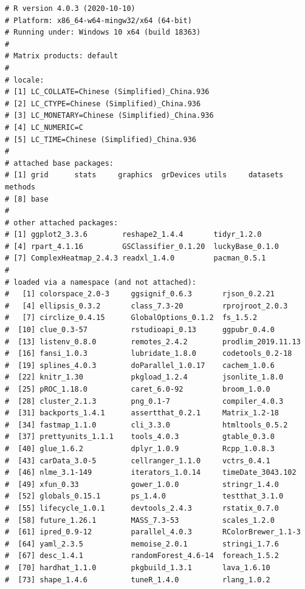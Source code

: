 \documentclass[
  12pt,
]{book}
\begin{document}
\begin{verbatim}
# R version 4.0.3 (2020-10-10)
# Platform: x86_64-w64-mingw32/x64 (64-bit)
# Running under: Windows 10 x64 (build 18363)
# 
# Matrix products: default
# 
# locale:
# [1] LC_COLLATE=Chinese (Simplified)_China.936 
# [2] LC_CTYPE=Chinese (Simplified)_China.936   
# [3] LC_MONETARY=Chinese (Simplified)_China.936
# [4] LC_NUMERIC=C                              
# [5] LC_TIME=Chinese (Simplified)_China.936    
# 
# attached base packages:
# [1] grid      stats     graphics  grDevices utils     datasets  methods  
# [8] base     
# 
# other attached packages:
# [1] ggplot2_3.3.6        reshape2_1.4.4       tidyr_1.2.0         
# [4] rpart_4.1.16         GSClassifier_0.1.20  luckyBase_0.1.0     
# [7] ComplexHeatmap_2.4.3 readxl_1.4.0         pacman_0.5.1        
# 
# loaded via a namespace (and not attached):
#   [1] colorspace_2.0-3     ggsignif_0.6.3       rjson_0.2.21        
#   [4] ellipsis_0.3.2       class_7.3-20         rprojroot_2.0.3     
#   [7] circlize_0.4.15      GlobalOptions_0.1.2  fs_1.5.2            
#  [10] clue_0.3-57          rstudioapi_0.13      ggpubr_0.4.0        
#  [13] listenv_0.8.0        remotes_2.4.2        prodlim_2019.11.13  
#  [16] fansi_1.0.3          lubridate_1.8.0      codetools_0.2-18    
#  [19] splines_4.0.3        doParallel_1.0.17    cachem_1.0.6        
#  [22] knitr_1.30           pkgload_1.2.4        jsonlite_1.8.0      
#  [25] pROC_1.18.0          caret_6.0-92         broom_1.0.0         
#  [28] cluster_2.1.3        png_0.1-7            compiler_4.0.3      
#  [31] backports_1.4.1      assertthat_0.2.1     Matrix_1.2-18       
#  [34] fastmap_1.1.0        cli_3.3.0            htmltools_0.5.2     
#  [37] prettyunits_1.1.1    tools_4.0.3          gtable_0.3.0        
#  [40] glue_1.6.2           dplyr_1.0.9          Rcpp_1.0.8.3        
#  [43] carData_3.0-5        cellranger_1.1.0     vctrs_0.4.1         
#  [46] nlme_3.1-149         iterators_1.0.14     timeDate_3043.102   
#  [49] xfun_0.33            gower_1.0.0          stringr_1.4.0       
#  [52] globals_0.15.1       ps_1.4.0             testthat_3.1.0      
#  [55] lifecycle_1.0.1      devtools_2.4.3       rstatix_0.7.0       
#  [58] future_1.26.1        MASS_7.3-53          scales_1.2.0        
#  [61] ipred_0.9-12         parallel_4.0.3       RColorBrewer_1.1-3  
#  [64] yaml_2.3.5           memoise_2.0.1        stringi_1.7.6       
#  [67] desc_1.4.1           randomForest_4.6-14  foreach_1.5.2       
#  [70] hardhat_1.1.0        pkgbuild_1.3.1       lava_1.6.10         
#  [73] shape_1.4.6          tuneR_1.4.0          rlang_1.0.2         

\end{verbatim}
\end{document}
